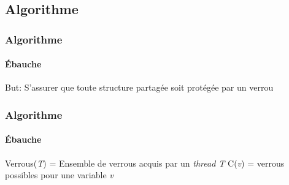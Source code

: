 \documentclass{beamer}
\begin{document}
\subsection{Algorithme}
\begin{frame}
\frametitle{Algorithme}
\framesubtitle{Ébauche}
But: S'assurer que toute structure partagée soit protégée par un verrou
\end{frame}

\begin{frame}
\frametitle{Algorithme}
\framesubtitle{Ébauche}
\begin{algorithm}[H]
 Verrous(\textit{T}) = Ensemble de verrous acquis par un \textit{thread T}\;
 C(\textit{v}) = verrous possibles pour une variable \textit{v}\;
 
 
\end{algorithm}
\end{frame}
\end{document}
